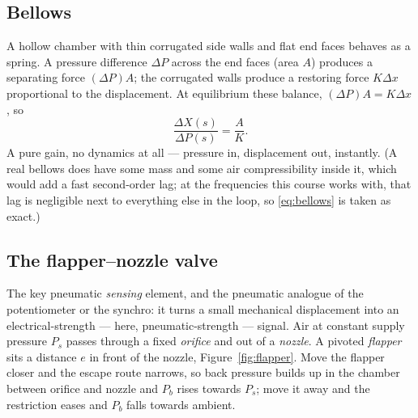 \documentclass[11pt,a4paper]{article}
\begin{document}
\subsection{Bellows}
\label{sss:bellows}

A hollow chamber with thin corrugated side walls and flat end faces behaves as
a spring. A pressure difference $\Delta P$ across the end faces (area $A$)
produces a separating force $(\Delta P)A$; the corrugated walls produce a
restoring force $K\Delta x$ proportional to the displacement. At equilibrium
these balance, $(\Delta P)A = K\Delta x$, so
\begin{equation}
  \frac{\Delta X(s)}{\Delta P(s)}=\frac{A}{K}.
  \label{eq:bellows}
\end{equation}
A pure gain, no dynamics at all --- pressure in, displacement out, instantly.
(A real bellows does have some mass and some air compressibility inside it,
which would add a fast second-order lag; at the frequencies this course works
with, that lag is negligible next to everything else in the loop, so
\eqref{eq:bellows} is taken as exact.)

\subsection{The flapper--nozzle valve}
\label{sss:flappergain}

The key pneumatic \emph{sensing} element, and the pneumatic analogue of the
potentiometer or the synchro: it turns a small mechanical displacement into an
electrical-strength --- here, pneumatic-strength --- signal. Air at constant
supply pressure $P_{s}$ passes through a fixed \emph{orifice} and out of a
\emph{nozzle}. A pivoted \emph{flapper} sits a distance $e$ in front of the
nozzle, Figure~\ref{fig:flapper}. Move the flapper closer and the escape
route narrows, so back pressure builds up in the chamber between orifice and
nozzle and $P_{b}$ rises towards $P_{s}$; move it away and the restriction
eases and $P_{b}$ falls towards ambient.
\end{document}
